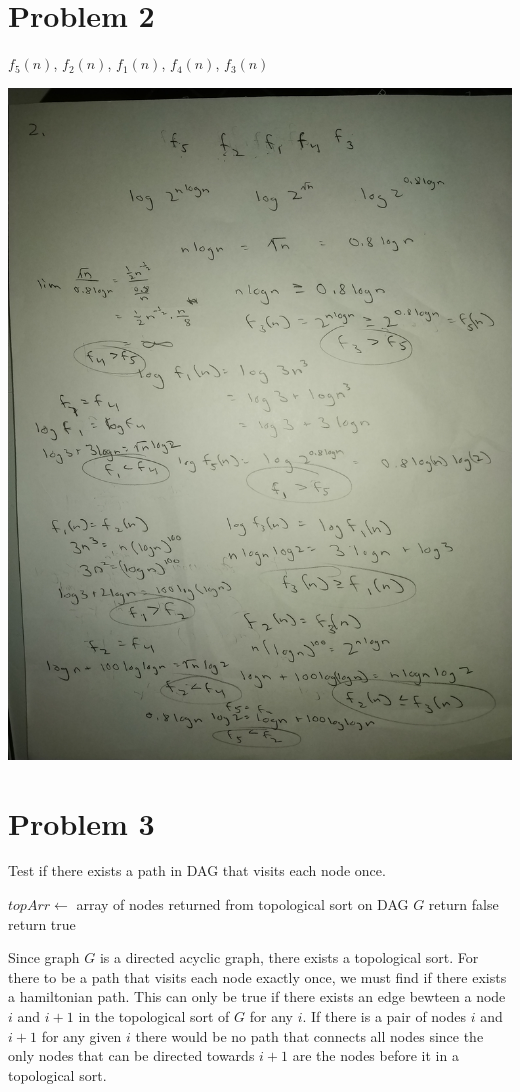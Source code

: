 \documentclass[12pt]{article}
\begin{document}
\newpage
\section*{Problem 2}
$f_5(n)$, $f_2(n)$, $f_1(n)$, $f_4(n)$, $f_3(n)$
\newline
\begin{center}
    \includegraphics[scale=0.155, angle=270]{hi.jpg}
\end{center}


\newpage
\section*{Problem 3}
\begin{algorithm}
\caption{Test if there exists a path in DAG that visits each node once.}
\begin{algorithmic}[1]
\State $topArr \gets $ array of nodes returned from topological sort on DAG $G$
        \State return false
    \EndIf
\EndFor
\State return true
\end{algorithmic}
\end{algorithm}
Since graph $G$ is a directed acyclic graph, there exists a topological sort. For there to be a path that
visits each node exactly once, we must find if there exists a hamiltonian path. This can only be true
if there exists an edge bewteen a node $i$ and $i+1$ in the topological sort of $G$ for any $i$. If there
is a pair of nodes $i$ and $i+1$ for any given $i$ there would be no path that connects all nodes since
the only nodes that can be directed towards $i+1$ are the nodes before it in a topological sort.
\end{document}
